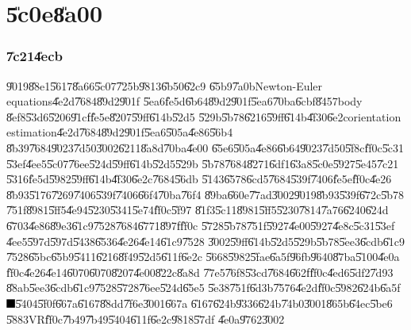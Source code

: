 \documentclass[12pt,a4paper]{article}
\begin{document}
%

\part{\U{5c0e}\U{8a00}}

\section{\U{7c21}\U{4ecb}}

\U{9019}\U{88e1}\U{5617}\U{8a66}\U{5c07}\U{725b}\U{9813}\U{6b50}\U{62c9}%
\U{65b9}\U{7a0b}Newton-Euler equations\U{4e2d}\U{7684}\U{89d2}\U{901f}%
\U{5ea6}\U{fe5d}\U{6b64}\U{89d2}\U{901f}\U{5ea6}\U{70ba}\U{6cbf}\U{8457}body%
\U{8ef8}\U{53d6}\U{5206}\U{91cf}\U{fe5e}\U{8207}\U{59ff}\U{614b}\U{52d5}%
\U{529b}\U{5b78}\U{6216}\U{59ff}\U{614b}\U{4f30}\U{6e2c}orientation
estimation\U{4e2d}\U{7684}\U{89d2}\U{901f}\U{5ea6}\U{505a}\U{4e86}\U{56b4}%
\U{8b39}\U{7684}\U{9023}\U{7d50}\U{3002}\U{6211}\U{8a8d}\U{70ba}\U{4e00}%
\U{65e6}\U{505a}\U{4e86}\U{6b64}\U{9023}\U{7d50}\U{5f8c}\U{ff0c}\U{5c31}%
\U{53ef}\U{4ee5}\U{5c07}\U{76ee}\U{524d}\U{59ff}\U{614b}\U{52d5}\U{529b}%
\U{5b78}\U{7684}\U{8271}\U{6df1}\U{63a8}\U{5c0e}\U{5927}\U{5e45}\U{7c21}%
\U{5316}\U{fe5d}\U{5982}\U{59ff}\U{614b}\U{4f30}\U{6e2c}\U{7684}\U{56db}%
\U{5143}\U{6578}\U{6cd5}\U{7684}\U{539f}\U{7406}\U{fe5e}\U{ff0c}\U{4e26}%
\U{8b93}\U{5176}\U{7269}\U{7406}\U{539f}\U{7406}\U{66f4}\U{70ba}\U{76f4}%
\U{89ba}\U{660e}\U{77ad}\U{3002}\U{9019}\U{8b93}\U{539f}\U{672c}\U{5b78}%
\U{751f}\U{8981}\U{5ff5}\U{4e94}\U{5230}\U{5341}\U{5e74}\U{ff0c}\U{5f97}%
\U{81f3}\U{5c11}\U{8981}\U{5ff5}\U{5230}\U{7814}\U{7a76}\U{6240}\U{624d}%
\U{6703}\U{4e86}\U{89e3}\U{61c9}\U{7528}\U{7684}\U{6771}\U{897f}\U{ff0c}%
\U{5728}\U{5b78}\U{751f}\U{5927}\U{4e00}\U{5927}\U{4e8c}\U{5c31}\U{53ef}%
\U{4ee5}\U{597d}\U{597d}\U{5438}\U{6536}\U{4e26}\U{4e14}\U{61c9}\U{7528}%
\U{3002}\U{59ff}\U{614b}\U{52d5}\U{529b}\U{5b78}\U{5ee3}\U{6cdb}\U{61c9}%
\U{7528}\U{65bc}\U{65b9}\U{5411}\U{6216}\U{8f49}\U{52d5}\U{611f}\U{6e2c}%
\U{5668}\U{5982}\U{5fae}\U{6a5f}\U{96fb}\U{9640}\U{87ba}\U{5100}\U{4e0a}%
\U{ff0c}\U{4e26}\U{4e14}\U{6070}\U{6070}\U{8207}\U{4e00}\U{822c}\U{8a8d}%
\U{77e5}\U{76f8}\U{53cd}\U{7684}\U{662f}\U{ff0c}\U{4ed6}\U{5df2}\U{7d93}%
\U{88ab}\U{5ee3}\U{6cdb}\U{61c9}\U{7528}\U{5728}\U{76ee}\U{524d}\U{65e5}%
\U{5e38}\U{751f}\U{6d3b}\U{7576}\U{4e2d}\U{ff0c}\U{5982}\U{624b}\U{6a5f}$%
\U{3001} $\U{5404}\U{5f0f}\U{667a}\U{6167}\U{88dd}\U{7f6e}\U{3001}\U{667a}%
\U{6167}\U{624b}\U{9336}\U{624b}\U{74b0}\U{3001}\U{865b}\U{64ec}\U{5be6}%
\U{5883}VR\U{ff0c}\U{7b49}\U{7b49}\U{5404}\U{611f}\U{6e2c}\U{9818}\U{57df}%
\U{4e0a}\U{9762}\U{3002}
\end{document}

